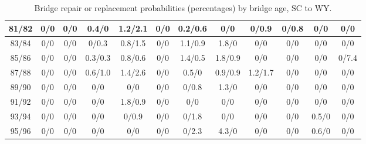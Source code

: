 \begin{table*}[htb]
\begin{tabular}{|c| c c c c c c c c c c c |}
81/82&0/0& 0/0& 0.4/0& 1.2/2.1& 0/0& 0.2/0.6& 0/0& 0/0.9& 0/0.8& 0/0& 0/0\\\hline
83/84&0/0& 0/0& 0/0.3& 0.8/1.5& 0/0& 1.1/0.9& 1.8/0& 0/0& 0/0& 0/0& 0/0\\\hline
85/86&0/0& 0/0& 0.3/0.3& 0.8/0.6& 0/0& 1.4/0.5& 1.8/0.9& 0/0& 0/0& 0/0& 0/7.4\\\hline
87/88&0/0& 0/0& 0.6/1.0& 1.4/2.6& 0/0& 0.5/0& 0.9/0.9& 1.2/1.7& 0/0& 0/0& 0/0\\\hline
89/90&0/0& 0/0& 0/0& 0/0& 0/0& 0/0.8& 1.3/0& 0/0& 0/0& 0/0& 0/0\\\hline
91/92&0/0& 0/0& 0/0& 1.8/0.9& 0/0& 0/0& 0/0& 0/0& 0/0& 0/0& 0/0\\\hline
93/94&0/0& 0/0& 0/0& 0/0.9& 0/0& 0/1.8& 0/0& 0/0& 0/0& 0.5/0& 0/0\\\hline
95/96&0/0& 0/0& 0/0& 0/0& 0/0& 0/2.3& 4.3/0& 0/0& 0/0& 0.6/0& 0/0\\\hline

    \end{tabular}
    \caption{Bridge repair or replacement probabilities (percentages) by bridge age, SC to WY.}
    \label{table:states4}
\end{table*}
    